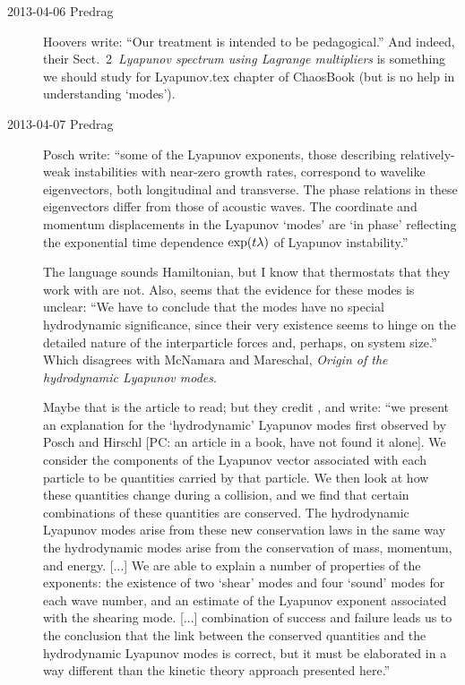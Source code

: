 \begin{description}
\item[2013-04-06 Predrag]                    \inCB
{Hoovers} write: ``Our treatment is intended to be
pedagogical.'' And indeed, their Sect.~2~\emph{Lyapunov spectrum
using Lagrange multipliers} is something we should study for
Lyapunov.tex chapter of ChaosBook (but is no help in understanding
`modes').

\item[2013-04-07 Predrag] Posch\etal{} write:
``some of
the Lyapunov exponents, those describing relatively-weak instabilities with
near-zero growth rates, correspond to wavelike eigenvectors, both longitudinal
and transverse. The phase relations in these eigenvectors differ from
those of acoustic waves. The coordinate and momentum displacements in
the Lyapunov `modes' are `in phase' reflecting the exponential time
dependence $\exp(t\lambda)$ of Lyapunov instability.''

The language sounds Hamiltonian, but I know that thermostats that
they work with are not. Also, seems that the evidence for these modes
is unclear: ``We have to conclude that the modes have no special
hydrodynamic significance, since their very existence seems to hinge
on the detailed nature of the interparticle forces and, perhaps, on
system size.'' Which disagrees with McNamara and Mareschal,
{\em Origin of the hydrodynamic {Lyapunov modes}}.

Maybe that is the article to read; but they credit
, and write: ``we present an explanation for the
`hydrodynamic' Lyapunov modes first observed by Posch and
Hirschl [PC: an article in a book, have not found it
alone]. We consider the components of the Lyapunov vector associated
with each particle to be quantities carried by that particle. We then
look at how these quantities change during a collision, and we find
that certain combinations of these quantities are conserved. The
hydrodynamic Lyapunov modes arise from these new conservation laws in
the same way the hydrodynamic modes arise from the conservation of
mass, momentum, and energy. [...] We are able to explain a number of
properties of the exponents: the existence of two `shear'  modes and
four `sound' modes for each wave number, and an estimate of the
Lyapunov exponent associated with the shearing mode. [...]
combination of success and failure leads us to the conclusion that
the link between the conserved quantities and the hydrodynamic
Lyapunov modes is correct, but it must be elaborated in a way
different than the kinetic theory approach presented here.''


\end{description}
